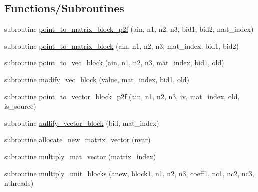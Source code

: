 \subsection*{Functions/\+Subroutines}
\begin{DoxyCompactItemize}
\item 
subroutine \hyperlink{_g_p_s_t_d_8_f90_a7c77432893a5e5f87a82cf99176436ac}{point\+\_\+to\+\_\+matrix\+\_\+block\+\_\+p2f} (ain, n1, n2, n3, bid1, bid2, mat\+\_\+index)
\item 
subroutine \hyperlink{_g_p_s_t_d_8_f90_a349311001f69cc5e61ebdef6d2486e59}{point\+\_\+to\+\_\+matrix\+\_\+block} (ain, n1, n2, n3, mat\+\_\+index, bid1, bid2)
\item 
subroutine \hyperlink{_g_p_s_t_d_8_f90_acf256d80fd5701dd4f7c85fc225fcc94}{point\+\_\+to\+\_\+vec\+\_\+block} (ain, n1, n2, n3, mat\+\_\+index, bid1, old)
\item 
subroutine \hyperlink{_g_p_s_t_d_8_f90_ae67693bf2ec96fd803d308ac53c9f55e}{modify\+\_\+vec\+\_\+block} (value, mat\+\_\+index, bid1, old)
\item 
subroutine \hyperlink{_g_p_s_t_d_8_f90_a5b7506647e02ed0a2fd0b527ab18df57}{point\+\_\+to\+\_\+vector\+\_\+block\+\_\+p2f} (ain, n1, n2, n3, iv, mat\+\_\+index, old, is\+\_\+source)
\item 
subroutine \hyperlink{_g_p_s_t_d_8_f90_a7b2b513d3fde46a61fbd8745bab0a8fa}{nullify\+\_\+vector\+\_\+block} (bid, mat\+\_\+index)
\item 
subroutine \hyperlink{_g_p_s_t_d_8_f90_a929972728e9b957c2c2079aa8aa8724f}{allocate\+\_\+new\+\_\+matrix\+\_\+vector} (nvar)
\item 
subroutine \hyperlink{_g_p_s_t_d_8_f90_a12f4b83ee04da7308f45c60b343f34df}{multiply\+\_\+mat\+\_\+vector} (matrix\+\_\+index)
\item 
subroutine \hyperlink{_g_p_s_t_d_8_f90_ae462928faab7ce745832e88af7a21571}{multiply\+\_\+unit\+\_\+blocks} (anew, block1, n1, n2, n3, coeff1, nc1, nc2, nc3, nthreads)
\end{DoxyCompactItemize}
